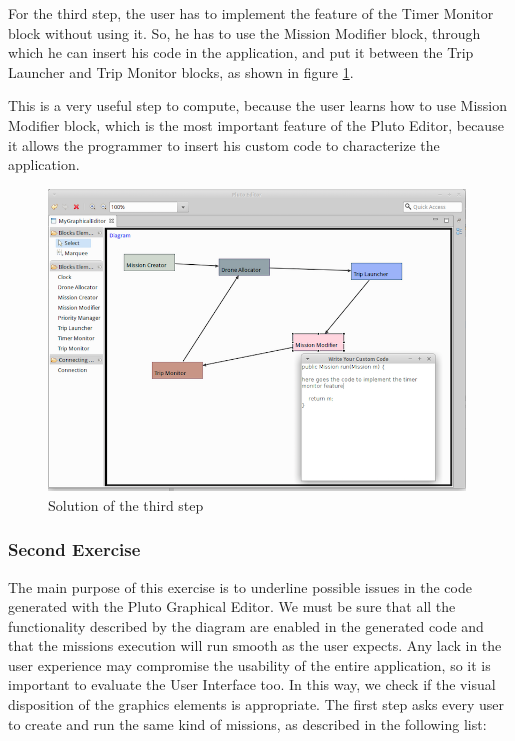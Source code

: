 \newpage


For the third step, the user has to implement the feature of the Timer Monitor block without using it.
So, he has to use the Mission Modifier block, through which he can insert his code in the application, and put it between the Trip Launcher and  Trip Monitor blocks, as shown in figure \ref{fig:thirdStep}.

This is a very useful step to compute, because the user learns how to use Mission Modifier block, which is the most important feature of the Pluto Editor, because it allows the programmer to insert his custom code to characterize the application.

\begin{figure}[H]
  \centering
  \includegraphics[width=\linewidth, height=8cm]{pictures/thirdStep.png}
  \caption{Solution of the third step}
  \label{fig:thirdStep}
\end{figure}

\subsubsection{Second Exercise}

The main purpose of this exercise is to underline possible issues in the code generated with the Pluto Graphical Editor. We must be sure that all the functionality described by the diagram are enabled in the generated code and that the missions execution will run smooth as the user expects. Any lack in the user experience may compromise the usability of the entire application, so it is important to evaluate the User Interface too. In this way, we check if the visual disposition of the graphics elements is appropriate.
The first step asks every user to create and run the same kind of missions, as described in the following list:

